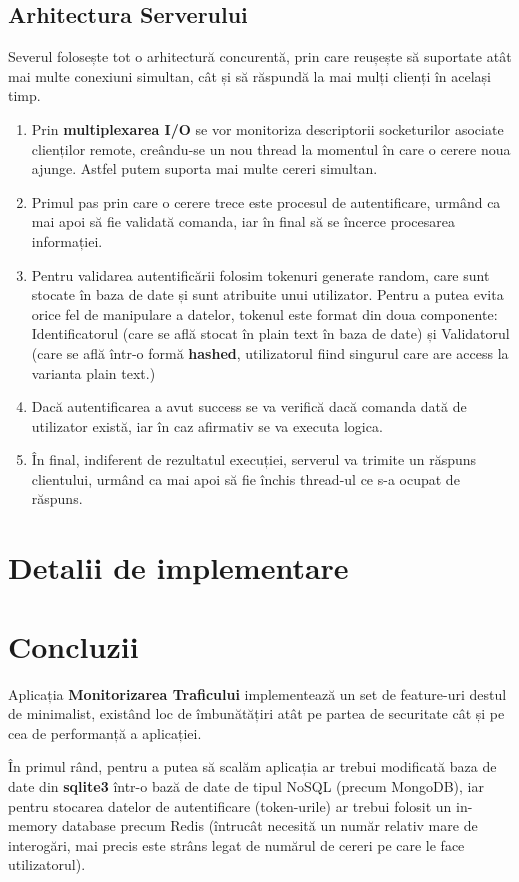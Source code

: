 \documentclass{article}
\begin{document}
\subsection{Arhitectura Serverului}
Severul folosește tot o arhitectură concurentă, prin care reușește să suportate atât mai multe conexiuni simultan, cât și să răspundă la mai mulți clienți în același timp.
\begin{enumerate}
    \item Prin \textbf{multiplexarea I/O} se vor monitoriza descriptorii socketurilor asociate clienților remote, creându-se un nou thread la momentul în care o cerere noua ajunge. Astfel putem suporta mai multe cereri simultan.
    \item Primul pas prin care o cerere trece este procesul de autentificare, urmând ca mai apoi să fie validată comanda, iar în final să se încerce procesarea informației. 
    \item Pentru validarea autentificării folosim tokenuri generate random, care sunt stocate în baza de date și sunt atribuite unui utilizator. Pentru a putea evita orice fel de manipulare a datelor, tokenul este format din doua componente: Identificatorul (care se află stocat în plain text în baza de date) și Validatorul (care se află într-o formă \textbf{hashed}, utilizatorul fiind singurul care are access la varianta plain text.)
    \item Dacă autentificarea a avut success se va verifică dacă comanda dată de utilizator există, iar în caz afirmativ se va executa logica. 
    \item În final, indiferent de rezultatul execuției, serverul va trimite un răspuns clientului, urmând ca mai apoi să fie închis thread-ul ce s-a ocupat de răspuns.
\end{enumerate}
\section{Detalii de implementare}
\section{Concluzii}
Aplicația \textbf{Monitorizarea Traficului} implementează un set de feature-uri destul de minimalist, existând loc de îmbunătățiri atât pe partea de securitate cât și pe cea de performanță a aplicației. 

În primul rând, pentru a putea să scalăm aplicația ar trebui modificată baza de date din \textbf{sqlite3} într-o bază de date de tipul NoSQL (precum MongoDB), iar pentru stocarea datelor de autentificare (token-urile) ar trebui folosit un in-memory database precum Redis (întrucât necesită un număr relativ mare de interogări, mai precis este strâns legat de numărul de cereri pe care le face utilizatorul).
\end{document}
